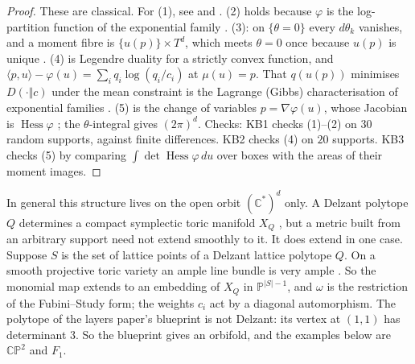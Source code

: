 \documentclass[11pt]{article}
\theoremstyle{definition}\newtheorem{definition}[theorem]{Definition}\newtheorem{remark}[theorem]{Remark}\newtheorem{example}[theorem]{Example}\newtheorem{problem}[theorem]{Open problem}\crefname{problem}{Problem}{Problems}
\begin{document}
\begin{proof}
These are classical. For (1), see \cite{Guillemin1994,Abreu2003} and \cite[Section~4.2]{Fulton1993}. (2) holds because $\varphi$ is the log-partition
function of the exponential family \cite{AmariNagaoka2000}. (3): on $\{\theta=0\}$ every $d\theta_k$ vanishes, and a moment fibre is $\{u(p)\}\times T^d$, which meets $\theta=0$
once because $u(p)$ is unique \cite{Birch1963}. (4) is Legendre duality for a strictly convex function, and $\langle p,u\rangle-\varphi(u)=\sum_iq_i\log(q_i/c_i)$ at
$\mu(u)=p$. That $q(u(p))$ minimises $D(\cdot\Vert c)$ under the mean constraint is the Lagrange (Gibbs) characterisation of exponential families \cite{AmariNagaoka2000}. (5) is the change of variables $p=\nabla\varphi(u)$, whose Jacobian is $\operatorname{Hess}\varphi$ \cite{DuistermaatHeckman1982}; the $\theta$-integral gives $(2\pi)^d$.
Checks: KB1 checks (1)--(2) on $30$ random supports, against finite differences. KB2 checks (4) on $20$ supports. KB3 checks (5) by comparing
$\int\det\operatorname{Hess}\varphi\,du$ over boxes with the areas of their moment images.
\end{proof}

In general this structure lives on the open orbit $(\mathbb C^*)^d$ only. A Delzant polytope $Q$ determines a compact symplectic toric
manifold $X_Q$ \cite{Delzant1988}, but a metric built from an arbitrary support need not extend smoothly to it. It does extend in one case. Suppose $S$ is the set of
lattice points of a Delzant lattice polytope $Q$. On a smooth projective toric variety an ample line bundle is very ample \cite[Section~3.4]{Fulton1993}.
So the monomial map extends to an embedding of $X_Q$ in $\mathbb P^{|S|-1}$, and $\omega$ is the restriction of the Fubini--Study form; the weights $c_i$ act by a diagonal
automorphism. The polytope of
the layers paper's blueprint is not Delzant: its vertex at $(1,1)$ has determinant $3$. So the blueprint gives an orbifold, and the examples
below are $\mathbb{CP}^2$ and $F_1$.
\end{document}
